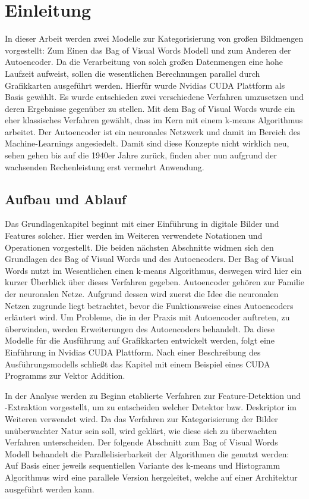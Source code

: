\chapter{Einleitung}

In dieser Arbeit werden zwei Modelle zur Kategorisierung von großen Bildmengen vorgestellt: Zum Einen das Bag of Visual Words Modell und zum Anderen der Autoencoder. Da die Verarbeitung von solch großen Datenmengen eine hohe Laufzeit aufweist, sollen die wesentlichen Berechnungen parallel durch Grafikkarten ausgeführt werden. Hierfür wurde Nvidias CUDA Plattform als Basis gewählt. Es wurde entschieden zwei verschiedene Verfahren umzusetzen und deren Ergebnisse gegenüber zu stellen. Mit dem Bag of Visual Words wurde ein eher klassisches Verfahren gewählt, dass im Kern mit einem k-means Algorithmus arbeitet. Der Autoencoder ist ein neuronales Netzwerk und damit im Bereich des Machine-Learnings angesiedelt. Damit sind diese Konzepte nicht wirklich neu, sehen gehen bis auf die 1940er Jahre zurück, finden aber nun aufgrund der wachsenden Rechenleistung erst vermehrt Anwendung.

\section{Aufbau und Ablauf}

Das Grundlagenkapitel beginnt mit einer Einführung in digitale Bilder und Features solcher. Hier werden im Weiteren verwendete Notationen und Operationen vorgestellt. Die beiden nächsten Abschnitte widmen sich den Grundlagen des Bag of Visual Words und des Autoencoders. Der Bag of Visual Words nutzt im Wesentlichen einen k-means Algorithmus, deswegen wird hier ein kurzer Überblick über dieses Verfahren gegeben. Autoencoder gehören zur Familie der neuronalen Netze. Aufgrund dessen wird zuerst die Idee die neuronalen Netzen zugrunde liegt betrachtet, bevor die Funktionsweise eines Autoencoders erläutert wird. Um Probleme, die in der Praxis mit Autoencoder auftreten, zu überwinden, werden Erweiterungen des Autoencoders behandelt. Da diese Modelle für die Ausführung auf Grafikkarten entwickelt werden, folgt eine Einführung in Nvidias CUDA Plattform. Nach einer Beschreibung des Ausführungsmodells schließt das Kapitel mit einem Beispiel eines CUDA Programms zur Vektor Addition.

In der Analyse werden zu Beginn etablierte Verfahren zur Feature-Detektion und -Extraktion vorgestellt, um zu entscheiden welcher Detektor bzw. Deskriptor im Weiteren verwendet wird. Da das Verfahren zur Kategorisierung der Bilder unüberwachter Natur sein soll, wird geklärt, wie diese sich zu überwachten Verfahren unterscheiden. Der folgende Abschnitt zum Bag of Visual Words Modell behandelt die Parallelisierbarkeit der Algorithmen die genutzt werden: Auf Basis einer jeweils sequentiellen Variante des k-means und Histogramm Algorithmus wird eine parallele Version hergeleitet, welche auf einer  Architektur ausgeführt werden kann.


